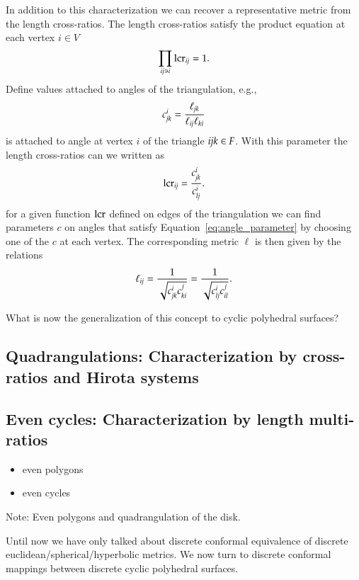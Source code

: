 \documentclass[Thesis]{subfiles}
\begin{document}
In addition to this characterization we can recover a representative metric from the length cross-ratios.
The length cross-ratios satisfy the product equation at each vertex $i\in V$
\begin{equation}
\prod_{\it ij\ni i} \operatorname{lcr}_{\it ij} = 1.
\end{equation}
Define values attached to angles of the triangulation, e.g., 
\begin{equation}
c^i_{\it jk}=\frac{\ell_{\it jk}}{\ell_{\it ij}\ell_{\it ki}}\label{eq:angle_parameter}
\end{equation} 
is attached to angle at vertex $i$ of the triangle $\it ijk\in F$.
With this parameter the length cross-ratios can we written as
\begin{equation}
\operatorname{lcr}_{\it ij}=\frac{c^i_{\it jk}}{c^i_{\it lj}}.
\end{equation}
for a given function $\operatorname{lcr}$ defined on edges of the triangulation we can find parameters $c$ on angles that satisfy Equation~\ref{eq:angle_parameter} by choosing one of the $c$ at each vertex.
The corresponding metric $\ell$ is then given by the relations
\begin{equation}
\ell_{\it ij} = \frac{1}{\sqrt{c^i_{\it jk}c^j_{\it ki}}} = \frac{1}{\sqrt{c^i_{\it lj}c^j_{\it il}}}.
\end{equation} 

What is now the generalization of this concept to cyclic polyhedral surfaces?

\subsection{Quadrangulations: Characterization by cross-ratios and Hirota systems}

\subsection{Even cycles: Characterization by length multi-ratios}

\begin{itemize}
\item even polygons
\item even cycles
\end{itemize}

Note: Even polygons and quadrangulation of the disk.


Until now we have only talked about discrete conformal equivalence of discrete euclidean/spherical/hyperbolic metrics.
We now turn to discrete conformal mappings between discrete cyclic polyhedral surfaces.
\end{document}
